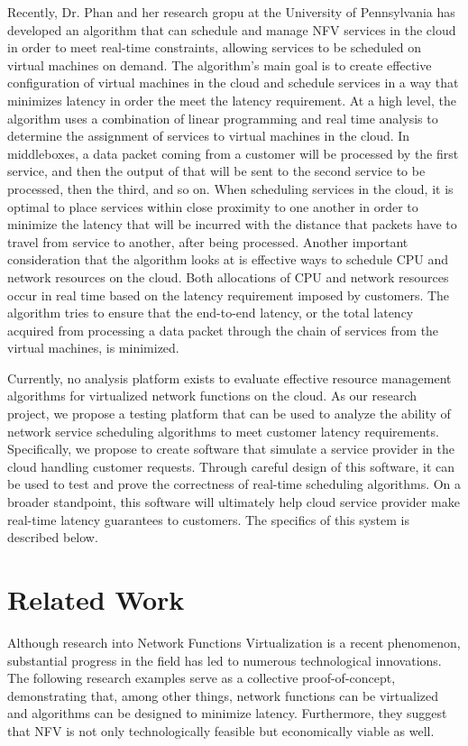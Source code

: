\documentclass{sig-alternate}
\begin{document}
Recently, Dr. Phan and her research gropu at the University of Pennsylvania has developed an algorithm that can schedule and manage NFV services in the cloud in order to meet real-time constraints, allowing services to be scheduled on virtual machines on demand. The algorithm's main goal is to create effective configuration of virtual machines in the cloud and schedule services in a way that minimizes latency in order the meet the latency requirement. At a high level, the algorithm uses a combination of linear programming and real time analysis to determine the assignment of services to virtual machines in the cloud. In middleboxes, a data packet coming from a customer will be processed by the first service, and then the output of that will be sent to the second service to be processed, then the third, and so on. When scheduling services in the cloud, it is optimal to place services within close proximity to one another in order to minimize the latency that will be incurred with the distance that packets have to travel from service to another, after being processed. Another important consideration that the algorithm looks at is effective ways to schedule CPU and network resources on the cloud. Both allocations of CPU and network resources occur in real time based on the latency requirement imposed by customers. The algorithm tries to ensure that the end-to-end latency, or the total latency acquired from processing a data packet through the chain of services from the virtual machines, is minimized.

Currently, no analysis platform exists to evaluate effective resource management algorithms for virtualized network functions on the cloud. As our research project, we propose a testing platform that can be used to analyze the ability of network service scheduling algorithms to meet customer latency requirements. Specifically, we propose to create software that simulate a service provider in the cloud handling customer requests. Through careful design of this software, it can be used to test and prove the correctness of real-time scheduling algorithms. On a broader standpoint, this software will ultimately help cloud service provider make real-time latency guarantees to customers. The specifics of this system is described below.


\section{Related Work}
\label{sec:related_work}
Although research into Network Functions Virtualization is a recent phenomenon, substantial progress in the field has led to numerous technological innovations. The following research examples serve as a collective proof-of-concept, demonstrating that, among other things, network functions can be virtualized and algorithms can be designed to minimize latency. Furthermore, they suggest that NFV is not only technologically feasible but economically viable as well.
\end{document}
